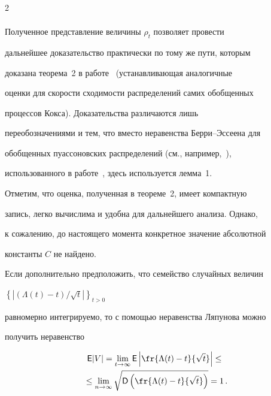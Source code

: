 \begin{multicols}{2}
\begin{multline*}
\end{multline*}


Полученное представление величины $\rho_t$ позволяет провести


дальнейшее доказательство практически по тому же пути, которым


доказана теорема~2 в работе~\cite{5a} (устанавливающая аналогичные


оценки для скорости сходимости распределений самих обобщенных


процессов Кокса). Доказательства различаются лишь


переобозначениями и тем, что вмес\-то неравенства Берри--Эссеена для


обобщенных пуассоновских распределений (см., например,~\cite{6a}),


использованного в работе~\cite{5a}, здесь используется лемма~1.





\smallskip





Отметим, что оценка, полученная в теореме~2, имеет компактную


запись, легко вычислима и удобна для дальнейшего анализа. Однако,


к сожалению, до настоящего момента конкретное значение абсолютной


константы $C$ не найдено.





Если дополнительно предположить, что семейство случайных величин


$\left\{\left|(\Lambda(t)-t)/\sqrt{t}\right|\right\}_{t>0}


$


равномерно интегрируемо, то с помощью неравенства Ляпунова можно


получить неравенство


\begin{multline}


{\sf E}|V|=\lim_{t\to\infty}{\sf E}\left |\fr{\Lambda(t)-


t}{\sqrt{t}}\right |\le{}\\


{}\le\lim_{n\to\infty}\sqrt{{\sf


D}\left (\fr{\Lambda(t)-t}{\sqrt{t}}\right )}=1\,.


\label{e3a}


\end{multline}



\end{multicols}
